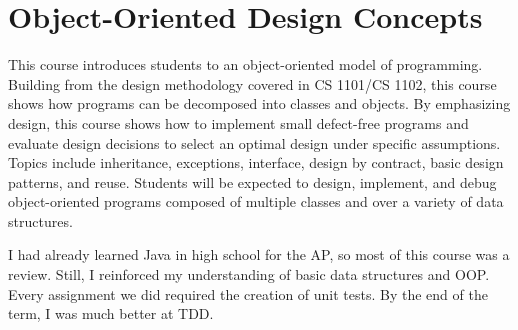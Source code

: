 \section{Object-Oriented Design Concepts}

\begin{meta}
\end{meta}


\coursedesc
This course introduces students to an object-oriented model of
programming. Building from the design methodology covered in CS 1101/CS
1102, this course shows how programs can be decomposed into classes
and objects. By emphasizing design, this course shows how to implement
small defect-free programs and evaluate design decisions to select an
optimal design under specific assumptions. Topics include inheritance,
exceptions, interface, design by contract, basic design patterns,
and reuse. Students will be expected to design, implement, and debug
object-oriented programs composed of multiple classes and over a variety
of data structures.

\courseself
I had already learned Java in high school for the AP, so most of this
course was a review. Still, I reinforced my understanding of basic data
structures and OOP. Every assignment we did required the creation of
unit tests. By the end of the term, I was much better at TDD.

